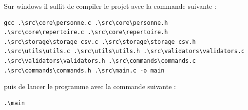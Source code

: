 \documentclass[12pt]{report}
\begin{document}
Sur windows il suffit de compiler le projet avec la commande suivante :

\begin{verbatim}
gcc .\src\core\personne.c .\src\core\personne.h .\src\core\repertoire.c .\src\core\repertoire.h .\src\storage\storage_csv.c .\src\storage\storage_csv.h .\src\utils\utils.c .\src\utils\utils.h .\src\validators\validators.c .\src\validators\validators.h .\src\commands\commands.c .\src\commands\commands.h .\src\main.c -o main
\end{verbatim}

puis de lancer le programme avec la commande suivante :
\begin{verbatim}
.\main
\end{verbatim}
\end{document}
